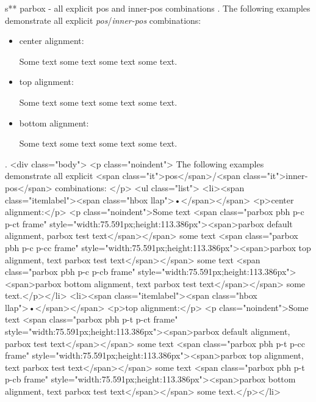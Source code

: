 s** parbox - all explicit pos and inner-pos combinations
.
\noindent
The following examples demonstrate all explicit \emph{pos}/\emph{inner-pos} combinations:
\begin{itemize}
\item center alignment:

\noindent
Some text
some text
some text
some text.

\item top alignment:

\noindent
Some text
some text
some text
some text.

\item bottom alignment:

\noindent
Some text
some text
some text
some text.
\end{itemize}
.
<div class="body">
<p class="noindent">
The following examples demonstrate all explicit <span class="it">pos</span>/<span class="it">inner‐pos</span> combinations:
</p>
<ul class="list">
<li><span class="itemlabel"><span class="hbox llap">•</span></span>
<p>center alignment:</p>
<p class="noindent">Some text <span class="parbox pbh p-c p-ct frame" style="width:75.591px;height:113.386px"><span>parbox default alignment, parbox test text</span></span> some text <span class="parbox pbh p-c p-cc frame" style="width:75.591px;height:113.386px"><span>parbox top alignment, text parbox test text</span></span> some text <span class="parbox pbh p-c p-cb frame" style="width:75.591px;height:113.386px"><span>parbox bottom alignment, text parbox test text</span></span> some text.</p></li>
<li><span class="itemlabel"><span class="hbox llap">•</span></span>
<p>top alignment:</p>
<p class="noindent">Some text <span class="parbox pbh p-t p-ct frame" style="width:75.591px;height:113.386px"><span>parbox default alignment, parbox test text</span></span> some text <span class="parbox pbh p-t p-cc frame" style="width:75.591px;height:113.386px"><span>parbox top alignment, text parbox test text</span></span> some text <span class="parbox pbh p-t p-cb frame" style="width:75.591px;height:113.386px"><span>parbox bottom alignment, text parbox test text</span></span> some text.</p></li>
